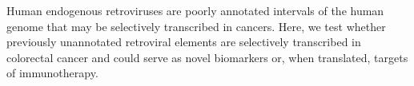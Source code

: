 Human endogenous retroviruses are poorly annotated intervals of the human genome that may be selectively transcribed in cancers.
Here, we test whether previously unannotated retroviral elements are selectively transcribed in colorectal cancer and could serve as novel biomarkers or, when translated, targets of immunotherapy.
